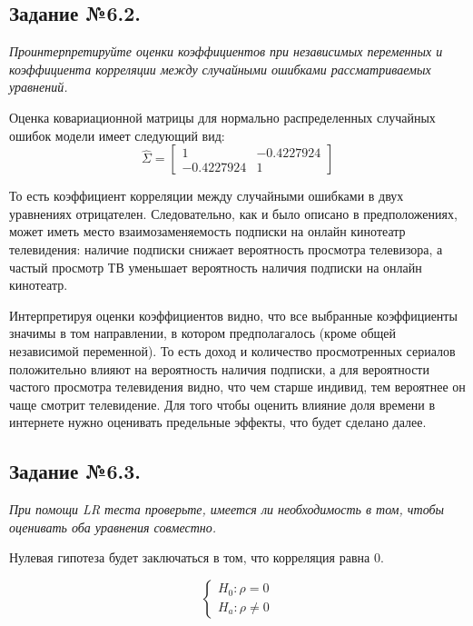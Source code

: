 \documentclass[a4paper,12pt]{article}
\begin{document}
		\subsection{Задание №6.2.}
		\textit{
	Проинтерпретируйте оценки коэффициентов при независимых переменных и коэффициента корреляции между случайными ошибками рассматриваемых уравнений.}

	\vspace{0.2cm}
	
	Оценка ковариационной матрицы для нормально распределенных случайных ошибок модели имеет следующий вид:
	\[
	\widehat{\Sigma} = 
	\begin{bmatrix}
		1 & -0.4227924 \\
		-0.4227924 & 1 
	\end{bmatrix}
	\]
	
	То есть коэффициент корреляции между случайными ошибками в двух уравнениях отрицателен. Следовательно, как и было описано в предположениях, может иметь место взаимозаменяемость подписки на онлайн кинотеатр телевидения: наличие подписки снижает вероятность просмотра телевизора, а частый просмотр ТВ уменьшает вероятность наличия подписки на онлайн кинотеатр.
	
	Интерпретируя оценки коэффициентов видно, что все выбранные коэффициенты значимы в том направлении, в котором предполагалось (кроме общей независимой переменной). То есть доход и количество просмотренных сериалов положительно влияют на вероятность наличия подписки, а для вероятности частого просмотра телевидения видно, что чем старше индивид, тем вероятнее он чаще смотрит телевидение. Для того чтобы оценить влияние доля времени в интернете нужно оценивать предельные эффекты, что будет сделано далее.

		\subsection{Задание №6.3.}
		\textit{
	При помощи LR теста проверьте, имеется ли необходимость в том, чтобы оценивать оба уравнения совместно.
				}
			
			\vspace{0.2cm}
			
			Нулевая гипотеза будет заключаться в том, что корреляция равна 0.
			
			\begin{equation*}
				\begin{cases}
					H_0: \rho = 0\\
					H_a: \rho \ne 0
				\end{cases}
			\end{equation*}
			
\end{document}
